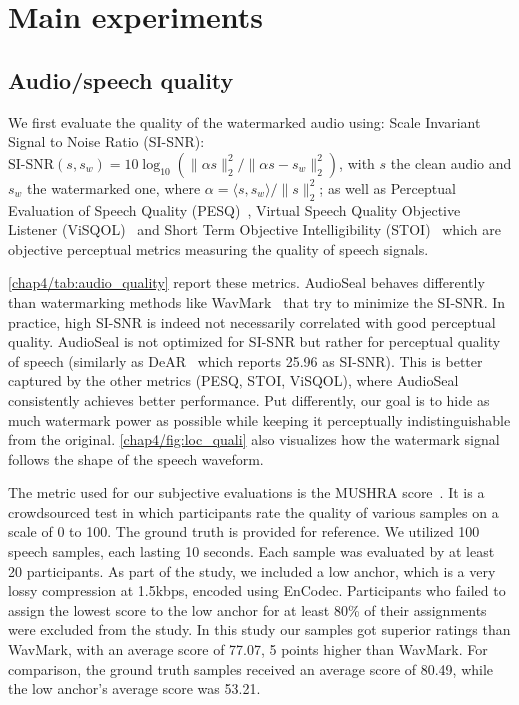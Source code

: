 
\section{Main experiments}
\label{chap4/sec:exps}



\subsection{Audio/speech quality}
\label{chap4/sec:quality}

We first evaluate the quality of the watermarked audio using:
Scale Invariant Signal to Noise Ratio (SI-SNR): 
$\textrm{SI-SNR}(s, s_w) = 10 \log_{10} \left( \| \alpha s \|_2^2 / \| \alpha s - s_w \|_2^2 \right)$,
with $s$ the clean audio and $s_w$ the watermarked one,
where $\alpha = \langle s, s_w \rangle / \| s \|_2^2$;
as well as Perceptual Evaluation of Speech Quality (PESQ)~\citep{rix2001perceptual}, 
Virtual Speech Quality Objective Listener (ViSQOL)~\citep{hines2012visqol} and
Short Term Objective Intelligibility (STOI)~\citep{taal2010short} which are objective perceptual metrics measuring the quality of speech signals.

\autoref{chap4/tab:audio_quality} report these metrics.
AudioSeal behaves differently than watermarking methods like WavMark~\citep{chen2023wavmark} that try to minimize the SI-SNR.
In practice, high SI-SNR is indeed not necessarily correlated with good perceptual quality.
AudioSeal is not optimized for SI-SNR but rather for perceptual quality of speech (similarly as DeAR~\citep{DEAR_Liu0FMZY23} which reports 25.96 as SI-SNR).
This is better captured by the other metrics (PESQ, STOI, ViSQOL), where AudioSeal consistently achieves better performance.
Put differently, our goal is to hide as much watermark power as possible while keeping it perceptually indistinguishable from the original.
\autoref{chap4/fig:loc_quali} also visualizes how the watermark signal follows the shape of the speech waveform.

The metric used for our subjective evaluations is the MUSHRA score~\citep{mushra}. 
It is a crowdsourced test in which participants rate the quality of various samples on a scale of 0 to 100. 
The ground truth is provided for reference. 
We utilized 100 speech samples, each lasting 10 seconds. 
Each sample was evaluated by at least 20 participants.
As part of the study, we included a low anchor, which is a very lossy compression at 1.5kbps, encoded using EnCodec. 
Participants who failed to assign the lowest score to the low anchor for at least 80\% of their assignments were excluded from the study.
In this study our samples got superior ratings than WavMark, with an average score of 77.07, 5 points higher than WavMark.
For comparison, the ground truth samples received an average score of 80.49, while the low anchor's average score was 53.21.


